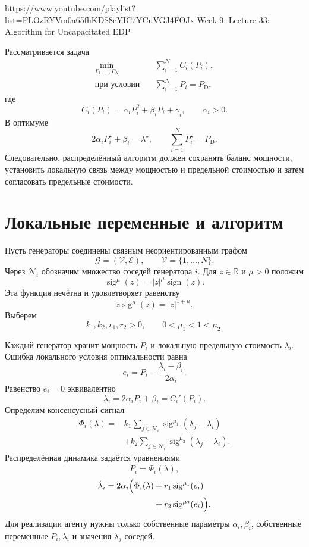 
\sourcevideo
    {https://www.youtube.com/playlist?list=PLOzRYVm0a65fhKDS8cYIC7YCuVGJ4FOJx}
    {Week 9: Lecture 33: Algorithm for Uncapacitated EDP}

Рассматривается задача
\[
\begin{aligned}
    \min_{P_1,\ldots,P_N}\quad
    &\sum_{i=1}^{N}C_i(P_i),
    \\
    \text{при условии}\quad
    &\sum_{i=1}^{N}P_i=P_{\mathrm D},
\end{aligned}
\]
где
\[
    C_i(P_i)=\alpha_iP_i^2+\beta_iP_i+\gamma_i,
    \qquad \alpha_i>0.
\]
В оптимуме
\[
    2\alpha_iP_i^\star+\beta_i=\lambda^\star,
    \qquad
    \sum_{i=1}^{N}P_i^\star=P_{\mathrm D}.
\]
Следовательно, распределённый алгоритм должен сохранять баланс
мощности, установить локальную связь между мощностью и предельной
стоимостью и затем согласовать предельные стоимости.

\section{Локальные переменные и алгоритм}

Пусть генераторы соединены связным неориентированным графом
\[
    \mathcal G=(\mathcal V,\mathcal E),
    \qquad
    \mathcal V=\{1,\ldots,N\}.
\]
Через \(\mathcal N_i\) обозначим множество соседей генератора \(i\).
Для \(z\in\mathbb R\) и \(\mu>0\) положим
\[
    \operatorname{sig}^{\mu}(z)
    =
    |z|^\mu\operatorname{sign}(z).
\]
Эта функция нечётна и удовлетворяет равенству
\[
    z\operatorname{sig}^{\mu}(z)=|z|^{1+\mu}.
\]
Выберем
\[
    k_1,k_2,r_1,r_2>0,
    \qquad
    0<\mu_1<1<\mu_2.
\]

Каждый генератор хранит мощность \(P_i\) и локальную предельную
стоимость \(\lambda_i\). Ошибка локального условия оптимальности
равна
\[
    e_i
    =
    P_i-
    \frac{\lambda_i-\beta_i}{2\alpha_i}.
\]
Равенство \(e_i=0\) эквивалентно
\[
    \lambda_i=2\alpha_iP_i+\beta_i=C_i'(P_i).
\]
Определим консенсусный сигнал
\[
\begin{aligned}
    \Phi_i(\lambda)
    ={}&
    k_1
    \sum_{j\in\mathcal N_i}
    \operatorname{sig}^{\mu_1}(\lambda_j-\lambda_i)
    \\
    &+
    k_2
    \sum_{j\in\mathcal N_i}
    \operatorname{sig}^{\mu_2}(\lambda_j-\lambda_i).
\end{aligned}
\]
Распределённая динамика задаётся уравнениями
\[
    \dot P_i=\Phi_i(\lambda),
\]
\[
\begin{aligned}
    \dot\lambda_i
    =
    2\alpha_i
    \Bigl(
        \Phi_i(\lambda)
        &+r_1\operatorname{sig}^{\mu_1}(e_i)
        \\
        &+r_2\operatorname{sig}^{\mu_2}(e_i)
    \Bigr).
\end{aligned}
\]
Для реализации агенту нужны только собственные параметры
\(\alpha_i,\beta_i\), собственные переменные \(P_i,\lambda_i\) и
значения \(\lambda_j\) соседей.

